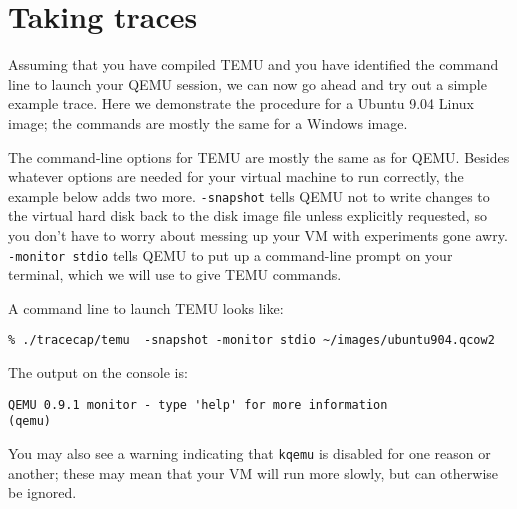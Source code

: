 \section {Taking traces}

Assuming that you have compiled TEMU and you have identified the
command line to launch your QEMU session, we can now go ahead and try
out a simple example trace. Here we demonstrate the procedure for a
Ubuntu 9.04 Linux image; the commands are mostly the same for a Windows
image.

The command-line options for TEMU are mostly the same as for
QEMU. Besides whatever options are needed for your virtual machine to
run correctly, the example below adds two more. \verb'-snapshot' tells
QEMU not to write changes to the virtual hard disk back to the disk
image file unless explicitly requested, so you don't have to worry
about messing up your VM with experiments gone awry.
\verb'-monitor stdio' tells QEMU to put up a command-line prompt on
your terminal, which we will use to give TEMU commands. 

A  command line to launch TEMU looks like:

\begin{Verbatim}[frame=lines, framesep=.5em]
% cd ~/bitblaze/temu
% ./tracecap/temu  -snapshot -monitor stdio ~/images/ubuntu904.qcow2
\end{Verbatim}

The output on the console is:

\begin{Verbatim}[frame=lines, framesep=.5em]
QEMU 0.9.1 monitor - type 'help' for more information
(qemu)
\end{Verbatim}

You may also see a warning indicating that \verb'kqemu' is disabled
for one reason or another; these may mean that your VM will run more
slowly, but can otherwise be ignored.

